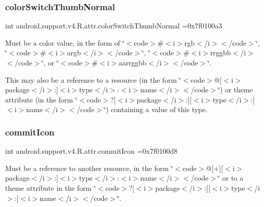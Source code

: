 \subsubsection{\texorpdfstring{color\+Switch\+Thumb\+Normal}{colorSwitchThumbNormal}}
{\footnotesize\ttfamily int android.\+support.\+v4.\+R.\+attr.\+color\+Switch\+Thumb\+Normal =0x7f0100a3\hspace{0.3cm}{\ttfamily [static]}}

Must be a color value, in the form of \char`\"{}$<$code$>$\#$<$i$>$rgb$<$/i$>$$<$/code$>$\char`\"{}, \char`\"{}$<$code$>$\#$<$i$>$argb$<$/i$>$$<$/code$>$\char`\"{}, \char`\"{}$<$code$>$\#$<$i$>$rrggbb$<$/i$>$$<$/code$>$\char`\"{}, or \char`\"{}$<$code$>$\#$<$i$>$aarrggbb$<$/i$>$$<$/code$>$\char`\"{}. 

This may also be a reference to a resource (in the form \char`\"{}$<$code$>$@\mbox{[}$<$i$>$package$<$/i$>$\+:\mbox{]}$<$i$>$type$<$/i$>$\+:$<$i$>$name$<$/i$>$$<$/code$>$\char`\"{}) or theme attribute (in the form \char`\"{}$<$code$>$?\mbox{[}$<$i$>$package$<$/i$>$\+:\mbox{]}\mbox{[}$<$i$>$type$<$/i$>$\+:\mbox{]}$<$i$>$name$<$/i$>$$<$/code$>$\char`\"{}) containing a value of this type. \mbox{\label{classandroid_1_1support_1_1v4_1_1R_1_1attr_aaaa25c2285a9f33ef704eaed37165397}} 
\subsubsection{\texorpdfstring{commit\+Icon}{commitIcon}}
{\footnotesize\ttfamily int android.\+support.\+v4.\+R.\+attr.\+commit\+Icon =0x7f0100d8\hspace{0.3cm}{\ttfamily [static]}}

Must be a reference to another resource, in the form \char`\"{}$<$code$>$@\mbox{[}+\mbox{]}\mbox{[}$<$i$>$package$<$/i$>$\+:\mbox{]}$<$i$>$type$<$/i$>$\+:$<$i$>$name$<$/i$>$$<$/code$>$\char`\"{} or to a theme attribute in the form \char`\"{}$<$code$>$?\mbox{[}$<$i$>$package$<$/i$>$\+:\mbox{]}\mbox{[}$<$i$>$type$<$/i$>$\+:\mbox{]}$<$i$>$name$<$/i$>$$<$/code$>$\char`\"{}. \mbox{\label{classandroid_1_1support_1_1v4_1_1R_1_1attr_af8f89d4cff9e410c8d717f6c8dd01b0c}} 
